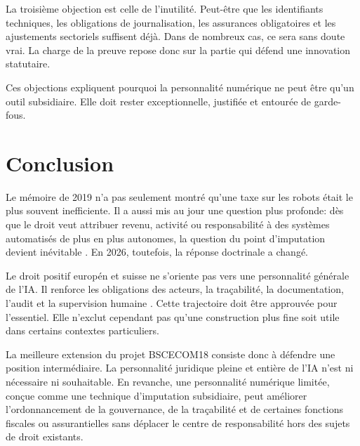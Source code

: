 \documentclass[11pt]{article}
\begin{document}
La troisi{\`e}me objection est celle de l'inutilit{\'e}. Peut-{\^e}tre que les identifiants techniques, les obligations de journalisation, les assurances obligatoires et les ajustements sectoriels suffisent d{\'e}j{\`a}. Dans de nombreux cas, ce sera sans doute vrai. La charge de la preuve repose donc sur la partie qui d{\'e}fend une innovation statutaire.

Ces objections expliquent pourquoi la personnalit{\'e} num{\'e}rique ne peut {\^e}tre qu'un outil subsidiaire. Elle doit rester exceptionnelle, justifi{\'e}e et entour{\'e}e de garde-fous.

\section{Conclusion}
Le m{\'e}moire de 2019 n'a pas seulement montr{\'e} qu'une taxe sur les robots {\'e}tait le plus souvent inefficiente. Il a aussi mis au jour une question plus profonde: d{\`e}s que le droit veut attribuer revenu, activit{\'e} ou responsabilit{\'e} {\`a} des syst{\`e}mes automatis{\'e}s de plus en plus autonomes, la question du point d'imputation devient in{\'e}vitable \citep{graz2019}. En 2026, toutefois, la r{\'e}ponse doctrinale a chang{\'e}.

Le droit positif europ{\'e}n et suisse ne s'oriente pas vers une personnalit{\'e} g{\'e}n{\'e}rale de l'IA. Il renforce les obligations des acteurs, la tra{\c c}abilit{\'e}, la documentation, l'audit et la supervision humaine \citep{eu2024aiact,ofcom2025swissai,coe2024framework}. Cette trajectoire doit {\^e}tre approuv{\'e}e pour l'essentiel. Elle n'exclut cependant pas qu'une construction plus fine soit utile dans certains contextes particuliers.

La meilleure extension du projet BSCECOM18 consiste donc {\`a} d{\'e}fendre une position interm{\'e}diaire. La personnalit{\'e} juridique pleine et enti{\`e}re de l'IA n'est ni n{\'e}cessaire ni souhaitable. En revanche, une personnalit{\'e} num{\'e}rique limit{\'e}e, con{\c c}ue comme une technique d'imputation subsidiaire, peut am{\'e}liorer l'ordonnancement de la gouvernance, de la tra{\c c}abilit{\'e} et de certaines fonctions fiscales ou assurantielles sans d{\'e}placer le centre de responsabilit{\'e} hors des sujets de droit existants.



\end{document}
